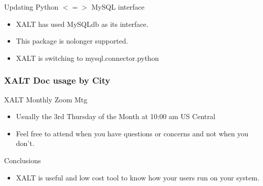 \documentclass{beamer}
\begin{document}
\begin{frame}{Updating Python $<=>$ MySQL interface}
  \begin{itemize}
    \item XALT has used MySQLdb as its interface.
    \item This package is nolonger supported.
    \item XALT is switching to mysql.connector.python 
  \end{itemize}
\end{frame}



\begin{frame}[fragile]
    \frametitle{XALT Doc usage by City}
\end{frame}

\begin{frame}{XALT Monthly Zoom Mtg}
  \begin{itemize}
    \item Usually the 3rd Thursday of the Month at 10:00 am US Central
    \item Feel free to attend when you have questions or concerns and
      not when you don't.
  \end{itemize}
\end{frame}

\begin{frame}{Conclusions}
  \begin{itemize}
    \item XALT is useful and low cost tool to know how your users run
      on your system.
  \end{itemize}
\end{frame}

%
\end{document}
